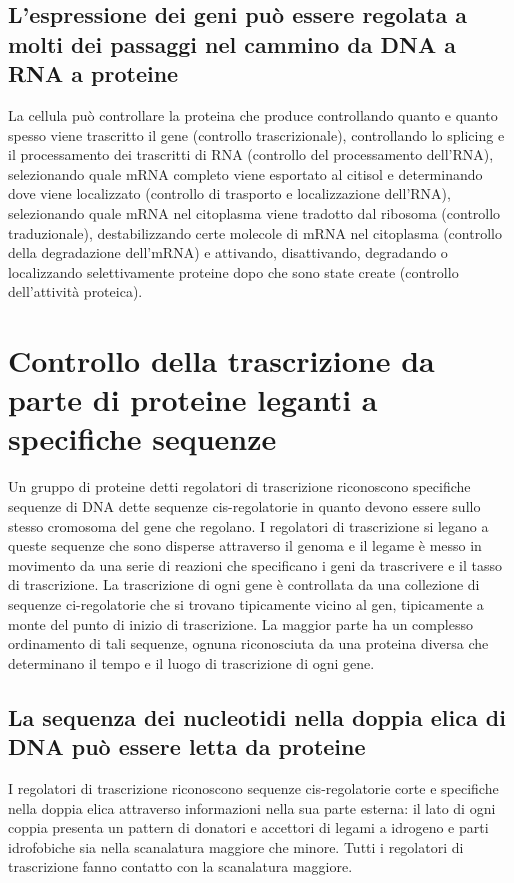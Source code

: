 \subsection{L'espressione dei geni pu\`o essere regolata a molti dei passaggi nel cammino da DNA a RNA a proteine}
La cellula pu\`o controllare la proteina che produce controllando quanto e quanto spesso viene trascritto il gene (controllo trascrizionale), controllando lo splicing e il processamento
dei trascritti di RNA (controllo del processamento dell'RNA), selezionando quale mRNA completo viene esportato al citisol e determinando dove viene localizzato (controllo di trasporto e 
localizzazione dell'RNA), selezionando quale mRNA nel citoplasma viene tradotto dal ribosoma (controllo traduzionale), destabilizzando certe molecole di mRNA nel citoplasma (controllo 
della degradazione dell'mRNA) e attivando, disattivando, degradando o localizzando selettivamente proteine dopo che sono state create (controllo dell'attivit\`a proteica).
\section{Controllo della trascrizione da parte di proteine leganti a specifiche sequenze}
Un gruppo di proteine detti regolatori di trascrizione riconoscono specifiche sequenze di DNA dette sequenze cis-regolatorie in quanto devono essere sullo stesso cromosoma del gene che
regolano. I regolatori di trascrizione si legano a queste sequenze che sono disperse attraverso il genoma e il legame \`e messo in movimento da una serie di reazioni che specificano 
i geni da trascrivere e il tasso di trascrizione. La trascrizione di ogni gene \`e controllata da una collezione di sequenze ci-regolatorie che si trovano tipicamente vicino al gen, 
tipicamente a monte del punto di inizio di trascrizione. La maggior parte ha un complesso ordinamento di tali sequenze, ognuna riconosciuta da una proteina diversa che determinano il 
tempo e il luogo di trascrizione di ogni gene. 
\subsection{La sequenza dei nucleotidi nella doppia elica di DNA pu\`o essere letta da proteine}
I regolatori di trascrizione riconoscono sequenze cis-regolatorie corte e specifiche nella doppia elica attraverso informazioni nella sua parte esterna: il lato di ogni coppia presenta
un pattern di donatori e accettori di legami a idrogeno e parti idrofobiche sia nella scanalatura maggiore che minore. Tutti i regolatori di trascrizione fanno contatto con la 
scanalatura maggiore.
